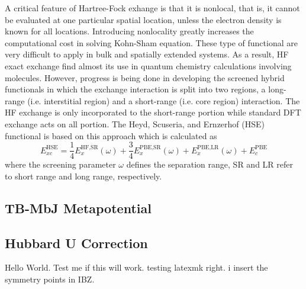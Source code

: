 A critical feature of Hartree-Fock exhange is that it is nonlocal, that is, it cannot be evaluated at one particular spatial location, unless the electron density is known for all locations. Introducing nonlocality greatly increases the computational cost in solving Kohn-Sham equation. These type of functional are very difficult to apply in bulk and spatially extended systems. As a result, HF exact exchange find almost its use in quantum chemistry calculations involving molecules. 
However, progress is being done in developing the screened hybrid functionals in which the exchange interaction is split into two regions, a long-range (i.e. interstitial region) and a short-range (i.e. core region)  interaction. The HF exchange is only incorporated to the short-range portion while standard DFT exchange acts on all portion. The Heyd, Scuseria, and Ernzerhof (HSE) functional is based on this approach which is calculated as \citep{Heyd2003,Krukau2006}
\begin{equation}
	E_{xc}^{\text{HSE}} = \frac{1}{4} E_x^{\text{HF,SR}}(\omega) +  \frac{3}{4} E_x^{\text{PBE,SR}}(\omega) + E_x^{\text{PBE,LR}}(\omega) + E_c^{\text{PBE}}
\end{equation} 
where the screening parameter $\omega$ defines the separation
range, SR and LR refer to short range and long range, respectively. 


\subsection{TB-MbJ Metapotential}
\subsection{Hubbard U Correction}
Hello World. Test me if this will work. testing latexmk right. i 
	{\color{red} insert the symmetry points in IBZ.}

